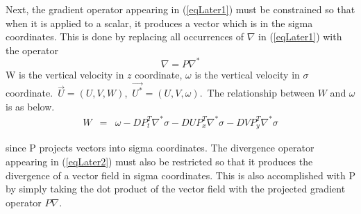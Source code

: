 \documentclass[oribibl]{llncs}
\begin{document}
Next, the gradient operator appearing in (\ref{eqLater1}) must be constrained so that when it is applied to a scalar, it produces a vector which is in the sigma coordinates. This is done by replacing all occurrences of $\nabla$ in (\ref{eqLater1}) with the operator
\begin{equation}
 \nabla=P\nabla^* \nonumber
\end{equation}
W is the vertical velocity in $z$ coordinate, $\omega$ is the vertical velocity in $\sigma$ coordinate.\ $\vec{U}=(U,V,W)$,\ $\vec{U^*}=(U,V,\omega)$.\ The relationship between $W$ and $\omega$ is as below.
\begin{eqnarray}
W&=&\omega -DP^T_t \nabla^* \sigma -DUP^T_x \nabla^* \sigma -DVP^T_y \nabla^* \sigma
\end{eqnarray}

since P projects vectors into sigma coordinates. The divergence operator appearing in (\ref{eqLater2}) must also be restricted so that it produces the divergence of a vector field in sigma coordinates. This is also accomplished with P by simply taking the dot product of the vector field with the projected gradient operator $P\nabla$.
\end{document}
